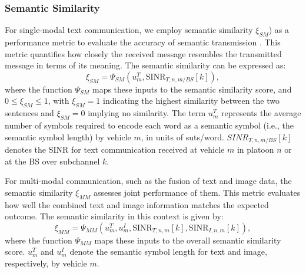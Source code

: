 \documentclass[10pt, lettersize,journal]{IEEEtran}
\begin{document}
	\subsubsection{Semantic Similarity}
	For single-modal text communication, we employ semantic similarity ${\xi _{SM}}$) as a performance metric to evaluate the accuracy of semantic transmission \cite{9398576}. This metric quantifies how closely the received message resembles the transmitted message in terms of its meaning. The semantic similarity can be expressed as:
	\begin{equation}\label{eq13}
		{\xi_{SM}} = {\Psi_{SM}}\left(u_m^T, \text{SINR}_{T,n,m/BS}[k]\right),
	\end{equation}
	where the function ${\Psi _{SM}}$ maps these inputs to the semantic similarity score, and $0 \le {\xi _{SM}} \le 1$, with ${\xi _{SM}} = 1$ indicating the highest similarity between the two sentences and ${\xi_{SM}} = 0$ implying no similarity. The term ${u_m^T}$ represents the average number of symbols required to encode each word as a semantic symbol (i.e., the semantic symbol length) by vehicle $m$, in units of suts/word. $SIN{R_{T,n,m/BS}}\left[ k \right]$ denotes the SINR for text communication received at vehicle $m$ in platoon $n$ or at the BS over subchannel $k$.
	
	For multi-modal communication, such as the fusion of text and image data, the semantic similarity $\xi_{MM}$ assesses joint performance of them. This metric evaluates how well the combined text and image information matches the expected outcome. The semantic similarity in this context is given by:
	\begin{equation}\label{eq13}
		{\xi_{MM}} = {\Psi_{MM}}\left(u_m^T, u_m^I, \text{SINR}_{T,n,m}[k], \text{SINR}_{I,n,m}[k]\right),
	\end{equation}
	where the function ${\Psi _{MM}}$ maps these inputs to the overall semantic similarity score. ${u_m^T}$ and ${u_m^I}$ denote the semantic symbol length for text and image, respectively, by vehicle $m$.
	
\end{document}
